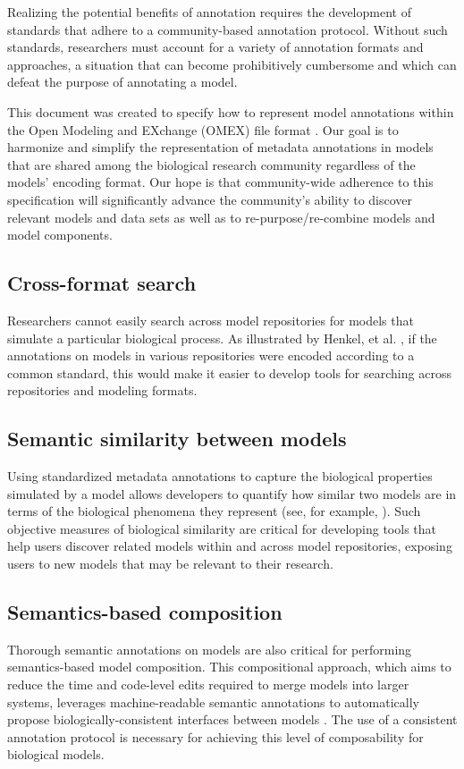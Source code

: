 \documentclass[pdftex,rgb,dvipsnames,svgnames,hyperref,table]{report}
\begin{document}
Realizing the potential benefits of annotation requires the development of standards that adhere to a community-based annotation protocol. Without such standards, researchers must account for a variety of annotation formats and approaches, a situation that can become prohibitively cumbersome and which can defeat the purpose of annotating a model.

This document was created to specify how to represent model annotations within the Open Modeling and EXchange (OMEX) file format \cite{Bergmann2014}. Our goal is to harmonize and simplify the representation of metadata annotations in models that are shared among the biological research community regardless of the models' encoding format. Our hope is that community-wide adherence to this specification will significantly advance the community's ability to discover relevant models and data sets as well as to re-purpose/re-combine models and model components. 

\label{motivation:example}
\subsection{Cross-format search}
Researchers cannot easily search across model repositories for models that simulate a particular biological process. As illustrated by Henkel, et al. \cite{Henkel2015}, if the annotations on models in various repositories were encoded according to a common standard, this would make it easier to develop tools for searching across repositories and modeling formats.

\subsection{Semantic similarity between models}
Using standardized metadata annotations to capture the biological properties simulated by a model allows developers to quantify how similar two models are in terms of the biological phenomena they represent (see, for example, \cite{Schulz2011,Henkel2018}). Such objective measures of biological similarity are critical for developing tools that help users discover related models within and across model repositories, exposing users to new models that may be relevant to their research.

\subsection{Semantics-based composition}
Thorough semantic annotations on models are also critical for performing semantics-based model composition. This compositional approach, which aims to reduce the time and code-level edits required to merge models into larger systems, leverages machine-readable semantic annotations to automatically propose biologically-consistent interfaces between models \cite{Neal2014}. The use of a consistent annotation protocol is necessary for achieving this level of composability for biological models.
\end{document}
